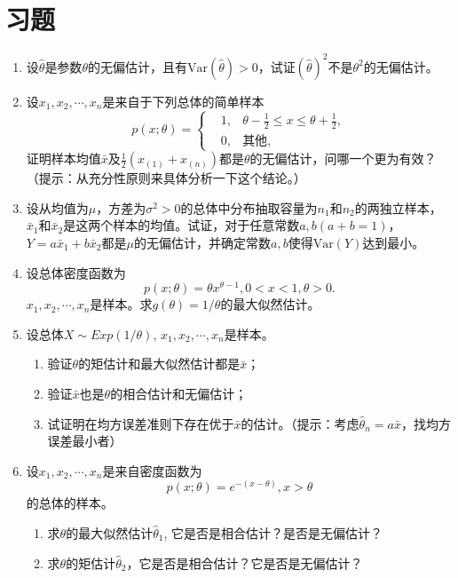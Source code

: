 \section{习题}
\begin{enumerate}
    \item 设$\hat{\theta}$是参数$\theta$的无偏估计，且有$\text{Var}(\hat{\theta})>0$，试证$\left(\hat{\theta}\right)^2$不是$\theta^2$的无偏估计。

\item 设$x_1,x_2,\cdots,x_n$是来自于下列总体的简单样本
$$
p(x;\theta) = \left\{
\begin{aligned}
    & 1, &\theta - \frac{1}{2} \leq x\leq \theta + \frac{1}{2},\\
& 0, &\text{其他},
\end{aligned}\right.
$$
证明样本均值$\bar{x}$及$\frac{1}{2}(x_{(1)}+x_{(n)})$都是$\theta$的无偏估计，问哪一个更为有效？（提示：从充分性原则来具体分析一下这个结论。）

\item 设从均值为$\mu$，方差为$\sigma^2>0$的总体中分布抽取容量为$n_1$和$n_2$的两独立样本，$\bar{x}_1$和$\bar{x}_2$是这两个样本的均值。试证，对于任意常数$a,b (a+b=1)$，$Y = a\bar{x}_1 + b\bar{x}_2$都是$\mu$的无偏估计，并确定常数$a,b$使得$\text{Var}(Y)$达到最小。

\item 设总体密度函数为
$$p(x;\theta) = \theta x^{\theta - 1}, 0<x<1,\theta > 0.$$
$x_1,x_2,\cdots,x_n$是样本。求$g(\theta)  =  1/\theta$的最大似然估计。

\item 设总体$X\sim Exp(1/\theta)$, $x_1,x_2,\cdots,x_n$是样本。
\begin{enumerate}
    \item  验证$\theta$的矩估计和最大似然估计都是$\bar{x}$；
\item 验证$\bar{x}$也是$\theta$的相合估计和无偏估计；
\item 试证明在均方误差准则下存在优于$\bar{x}$的估计。（提示：考虑$\hat{\theta}_n = a \bar{x}$，找均方误差最小者）
\end{enumerate}


\item 设$x_1,x_2,\cdots,x_n$是来自密度函数为
$$ 
p(x;\theta) = e^{-(x-\theta)},
x>\theta
$$
的总体的样本。
\begin{enumerate}
    \item 求$\theta$的最大似然估计$\hat{\theta}_1$, 它是否是相合估计？是否是无偏估计？
    \item 求$\theta$的矩估计$\hat{\theta}_2$，它是否是相合估计？它是否是无偏估计？
\end{enumerate}
\end{enumerate}